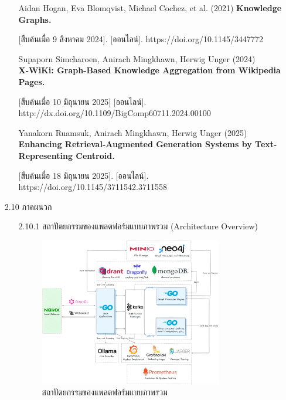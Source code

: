 \documentclass[12pt,a4paper]{article}
\begin{document}
\begin{enumerate}[leftmargin=2cm]
{\begin{enumerate}
            . [ออนไลน์]. https://doi.org/10.1145/3162957.3163014

            \item[] Aidan Hogan, Eva Blomqvist, Michael Cochez, et al. (2021)
            \textbf{Knowledge Graphs.}
            
            [สืบค้นเมื่อ 9 สิงหาคม 2024]. [ออนไลน์]. https://doi.org/10.1145/3447772

            \item[] Supaporn Simcharoen, Anirach Mingkhawn, Herwig Unger (2024) \\
            \textbf{X-WiKi: Graph-Based Knowledge Aggregation from Wikipedia Pages.}
            
            [สืบค้นเมื่อ 10 มิถุนายน 2025] [ออนไลน์]. http://dx.doi.org/10.1109/BigComp60711.2024.00100

            \item[] Yanakorn Ruamsuk, Anirach Mingkhawn, Herwig Unger (2025) \\
            \textbf{Enhancing Retrieval-Augmented Generation Systems by Text-Representing Centroid.}
            
            [สืบค้นเมื่อ 18 มิถุนายน 2025]. [ออนไลน์]. https://doi.org/10.1145/3711542.3711558
        \end{enumerate}
    }

    \vspace{14cm}

    \item[2.10] ภาคผนวก
    \\
    \begin{enumerate}
        \item[2.10.1] สถาปัตยกรรมของแพลตฟอร์มแบบภาพรวม (Architecture Overview)
        \begin{figure}[H]
            \centering
            \includegraphics[width=0.8\textwidth]{images/co_occurrence_knowlege_engineering_architecture_diagram.png}
            \caption{สถาปัตยกรรมของแพลตฟอร์มแบบภาพรวม}
            \label{fig:architecture_overview}
        \end{figure}


\end{enumerate}
\end{enumerate}
\end{document}
